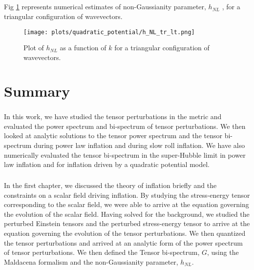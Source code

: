 \documentclass[12pt,a4paper,oneside]{book}
\begin{document}
\paragraph*{} Fig \ref{fig:tr_h_NL_vs_k_quad} represents numerical estimates of non-Gaussianity 
parameter, $h_{NL}$ , for a triangular configuration of wavevectors.

\begin{figure}
\begin{center}
\texttt{[image: plots/quadratic\_potential/h\_NL\_tr\_lt.png]}
\caption[Plot of $h_{NL}$ as a function of $k$ for a triangular configuration of wavevectors in quadratic potential model.]
{Plot of $h_{NL}$ as a function of $k$ for a triangular configuration of wavevectors.}
\label{fig:tr_h_NL_vs_k_quad}
\end{center}
\end{figure}


\chapter{Summary}

\paragraph*{} In this work, we have studied the tensor perturbations in the metric 
and evaluated the power spectrum and bi-spectrum of tensor perturbations. We 
then looked at analytic solutions to the tensor power spectrum and the tensor 
bi-spectrum during power law inflation and during slow roll inflation. 
We have also numerically evaluated the tensor bi-spectrum in the 
super-Hubble limit in power law inflation and for inflation driven 
by a quadratic potential model.

\paragraph*{} In the first chapter, we discussed the theory of inflation briefly and 
the constraints on a scalar field driving inflation. By studying the stress-energy tensor 
corresponding to the scalar field, we were able to arrive at the equation governing the 
evolution of the scalar field. Having solved for the background, we studied the perturbed 
Einstein tensors and the perturbed stress-energy tensor to arrive at the equation 
governing the evolution of the tensor perturbations. We then quantized the tensor 
perturbations and arrived at an analytic form of the power spectrum of tensor 
perturbations. We then defined the Tensor bi-spectrum, $G$, using the Maldacena 
formalism and the non-Gaussianity parameter, $h_{NL}$.
\end{document}
